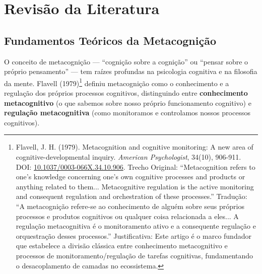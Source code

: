 \documentclass[12pt,a4paper,oneside]{abntex2}
\begin{document}
\chapter{Revisão da Literatura}
\label{ch:literatura}

\section{Fundamentos Teóricos da Metacognição}

O conceito de metacognição — ``cognição sobre a cognição'' ou ``pensar sobre o próprio pensamento'' — tem raízes profundas na psicologia cognitiva e na filosofia da mente. Flavell (1979)\footnote{Flavell, J. H. (1979). Metacognition and cognitive monitoring: A new area of cognitive-developmental inquiry. \textit{American Psychologist}, 34(10), 906-911. DOI: \href{https://doi.org/10.1037/0003-066X.34.10.906}{10.1037/0003-066X.34.10.906}. Trecho Original: ``Metacognition refers to one’s knowledge concerning one’s own cognitive processes and products or anything related to them... Metacognitive regulation is the active monitoring and consequent regulation and orchestration of these processes.'' Tradução: ``A metacognição refere-se ao conhecimento de alguém sobre seus próprios processos e produtos cognitivos ou qualquer coisa relacionada a eles... A regulação metacognitiva é o monitoramento ativo e a consequente regulação e orquestração desses processos.'' Justificativa: Este artigo é o marco fundador que estabelece a divisão clássica entre conhecimento metacognitivo e processos de monitoramento/regulação de tarefas cognitivas, fundamentando o desacoplamento de camadas no ecossistema.} definiu metacognição como o conhecimento e a regulação dos próprios processos cognitivos, distinguindo entre \textbf{conhecimento metacognitivo} (o que sabemos sobre nosso próprio funcionamento cognitivo) e \textbf{regulação metacognitiva} (como monitoramos e controlamos nossos processos cognitivos).
\end{document}
